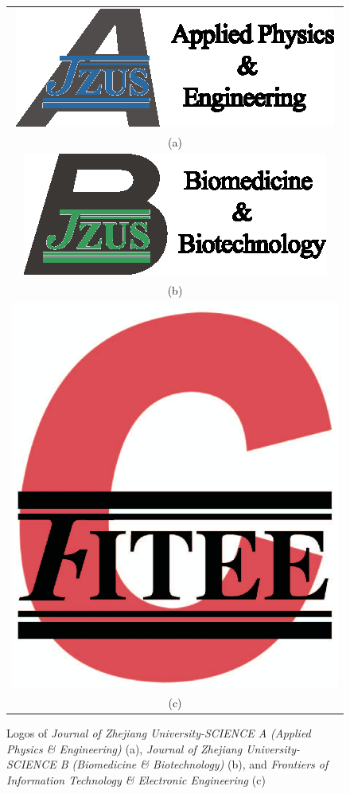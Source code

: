 \documentclass[twoside,twocolumn]{article}
\begin{document}
\begin{figure}[!htb]\small
\centering
\begin{tabular}{c}
\includegraphics[scale=0.9]{pics/jzusalogo.eps}\\
\footnotesize\sf (a)\\[3mm]
\includegraphics[scale=0.9]{pics/jzusblogo.eps}\\
\footnotesize\sf (b)\\
\includegraphics[scale=0.26]{pics/fiteelogo.eps}\\
\footnotesize\sf (c)\\
\end{tabular}
\caption{Logos of \emph{Journal of Zhejiang University-SCIENCE A (Applied Physics {\sf \slshape \&} Engineering)} (a), \emph{Journal of Zhejiang University-SCIENCE B (Biomedicine {\sf \slshape \&} Biotechnology)} (b), and \emph{Frontiers of Information Technology {\sf \slshape \&} Electronic Engineering} (c)}
\label{fig:logo}
\end{figure}
\end{document}
